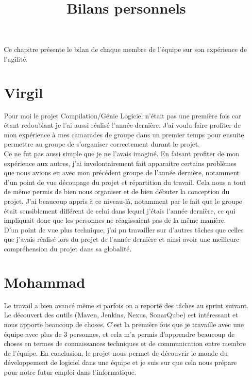 \documentclass[a4paper,12pt]{article}
\title{Bilans personnels}
\begin{document}
\maketitle

Ce chapitre présente le bilan de chaque membre de l'équipe sur son expérience de l'agilité.



\section{Virgil}

Pour moi le projet Compilation/Génie Logiciel n'était pas une première fois car étant redoublant je l'ai aussi réalisé l'année dernière. J'ai voulu faire profiter de mon expérience à mes camarades de groupe dans un premier temps pour ensuite permettre au groupe de s'organiser correctement durant le projet.\\
Ce ne fut pas aussi simple que je ne l'avais imaginé. En faisant profiter de mon expérience aux autres, j'ai involontairement fait apparaitre certains problèmes que nous avions eu avec mon précédent groupe de l'année dernière, notamment d'un point de vue découpage du projet et répartition du travail. Cela nous a tout de même permis de bien nous organiser et de bien débuter la conception du projet. J'ai beaucoup appris à ce niveau-là, notamment par le fait que le groupe était sensiblement différent de celui dans lequel j'étais l'année dernière, ce qui impliquait donc que les personnes ne réagissaient pas de la même manière.\\
D'un point de vue plus technique, j'ai pu travailler sur d'autres tâches que celles que j'avais réalisé lors du projet de l'année dernière et ainsi avoir une meilleure compréhension du projet dans sa globalité.\\

\section{Mohammad}

Le travail a bien avancé même si parfois on a reporté des tâches au sprint suivant. Le découvert des outils (Maven, Jenkins, Nexus, SonarQube) est intéressant et nous apporte beaucoup de choses. C'est la première fois que je travaille avec une équipe avec plus de 3 personnes, et cela m'a permis d'apprendre beaucoup de choses en termes de connaissances techniques et de communication entre membre de l'équipe. En conclusion, le projet nous permet de découvrir le monde du développement de logiciel dans une équipe et je suis sur que cela nous prépare pour notre futur emploi dans l'informatique.
\end{document}
